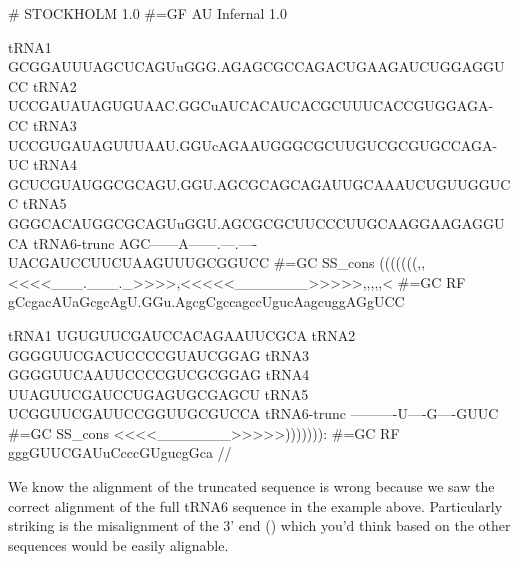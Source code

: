 {\samepage
\begin{sreoutput}
# STOCKHOLM 1.0
#=GF AU Infernal 1.0

tRNA1        GCGGAUUUAGCUCAGUuGGG.AGAGCGCCAGACUGAAGAUCUGGAGGUCC
tRNA2        UCCGAUAUAGUGUAAC.GGCuAUCACAUCACGCUUUCACCGUGGAGA-CC
tRNA3        UCCGUGAUAGUUUAAU.GGUcAGAAUGGGCGCUUGUCGCGUGCCAGA-UC
tRNA4        GCUCGUAUGGCGCAGU.GGU.AGCGCAGCAGAUUGCAAAUCUGUUGGUCC
tRNA5        GGGCACAUGGCGCAGUuGGU.AGCGCGCUUCCCUUGCAAGGAAGAGGUCA
tRNA6-trunc  AGC------A------.---.----UACGAUCCUUCUAAGUUUGCGGUCC
#=GC SS_cons (((((((,,<<<<___.___._>>>>,<<<<<_______>>>>>,,,,,<
#=GC RF      gCcgacAUaGcgcAgU.GGu.AgcgCgccagccUgucAagcuggAGgUCC

tRNA1        UGUGUUCGAUCCACAGAAUUCGCA
tRNA2        GGGGUUCGACUCCCCGUAUCGGAG
tRNA3        GGGGUUCAAUUCCCCGUCGCGGAG
tRNA4        UUAGUUCGAUCCUGAGUGCGAGCU
tRNA5        UCGGUUCGAUUCCGGUUGCGUCCA
tRNA6-trunc  ----------U----G----GUUC
#=GC SS_cons <<<<_______>>>>>))))))):
#=GC RF      gggGUUCGAUuCcccGUgucgGca
//
\end{sreoutput}
}

We know the alignment of the truncated sequence
 is wrong because we saw the correct alignment
of the full tRNA6 sequence in the example above. Particularly striking
is the misalignment of the 3' end () which you'd think
based on the other sequences would be easily alignable.

